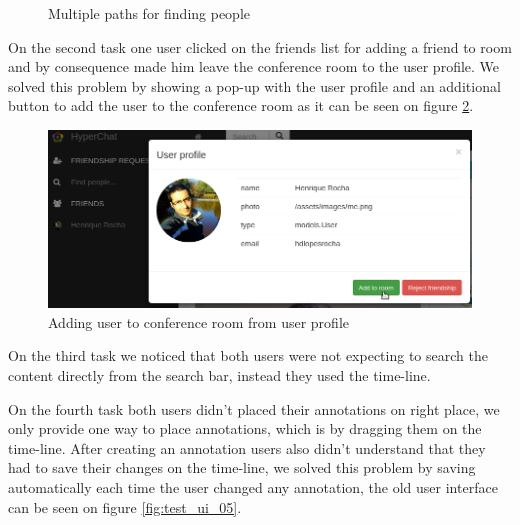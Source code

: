 \begin{figure}[!htb]
    \caption{Multiple paths for finding people}
    \label{fig:test_ui_01_02_03}
\end{figure}

On the second task one user clicked on the friends list for adding a friend to room and by consequence made him leave the conference room to the user profile. We solved this problem by showing a pop-up with the user profile and an additional button to add the user to the conference room as it can be seen on figure \ref{fig:test_ui_04}.

\begin{figure}[!htb]
\centering
\begin{minipage}[b]{0.7\linewidth}
\centering

    \includegraphics[width=\textwidth]{figures/test_ui_04.png}
\end{minipage}


    \caption{Adding user to conference room from user profile}
    \label{fig:test_ui_04}
\end{figure}

On the third task we noticed that both users were not expecting to search the content directly from the search bar, instead they used the time-line.

On the fourth task both users didn't placed their annotations on right place, we only provide one way to place annotations, which is by dragging them on the time-line. 
After creating an annotation users also didn't understand that they had to save their changes on the time-line, we solved this problem by saving automatically each time the user changed any annotation, the old user interface can be seen on figure \ref{fig:test_ui_05}.

